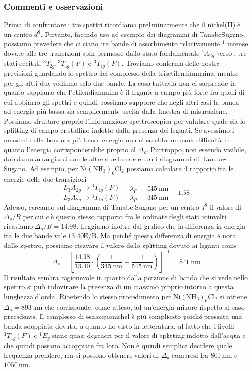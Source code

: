 \subsubsection{Commenti e osservazioni}
Prima di confrontare i tre spettri ricordiamo preliminarmente che il nichel(II) è un centro $d^8$. Pertanto, facendo uso ad esempio dei diagrammi di TanabeSugano, possiamo prevedere che ci siano tre bande di assorbimento relativamente $^1$ intense dovute alle tre transizioni spin-permesse dallo stato fondamentale ${ }^3 A_{2 g}$ verso i tre stati eccitati ${ }^3 T_{2 g},{ }^3 T_{1 g}(F)$ e ${ }^3 T_{1 g}(P)$. Troviamo conferma delle nostre previsioni guardando lo spettro del complesso della trisetilendiammina, mentre per gli altri due vediamo solo due bande. La cosa tuttavia non ci sorprende in quanto sappiamo che l'etilendiammina è il legante a campo più forte fra quelli di cui abbiamo gli spettri e quindi possiamo supporre che negli altri casi la banda ad energia più bassa sia semplicemente uscita dalla finestra di misurazione. Possiamo sfruttare proprio l'informazione spettroscopica per valutare quale sia lo splitting di campo cristallino indotto dalla presenza dei leganti. Se avessimo i massimi della banda a più bassa energia non ci sarebbe nessuna difficoltà in quanto l'energia corrisponderebbe proprio al $\Delta_o$. Purtroppo, non essendo visibile, dobbiamo arrangiarci con le altre due bande e con i diagrammi di Tanabe-Sugano. Ad esempio, per $\mathrm{Ni}\left(\mathrm{NH}_3\right)_6 \mathrm{Cl}_2$ possiamo calcolare il rapporto fra le energie delle due transizioni
$$
\frac{E_3 A_{2 g} \rightarrow{ }^3 T_{1 g}(P)}{E_3 A_{2 g} \rightarrow{ }^3 T_{1 g}(F)}=\frac{\lambda_F}{\lambda_P}=\frac{545 \mathrm{~nm}}{345 \mathrm{~nm}}=1.58
$$
Adesso, cercando sul diagramma di Tanabe-Sugano per un centro $d^8$ il valore di $\Delta_o / B$ per cui c'è questo stesso rapporto fra le ordinate degli stati coinvolti ricaviamo $\Delta_o / B=14.98$. Leggiamo inoltre dal grafico che la differenza in energia fra le due bande vale $13.40 \mathrm{E} / \mathrm{B}$. Ma poiché questa differenza di energia è nota dallo spettro, possiamo ricavare il valore dello splitting dovuto ai leganti come
$$
\Delta_o=\left[\frac{14.98}{13.40} \cdot\left(\frac{1}{345 \mathrm{~nm}}-\frac{1}{545 \mathrm{~nm}}\right)\right]^{-1}=841 \mathrm{~nm}
$$
Il risultato sembra ragionevole in quanto dalla porzione di banda che si vede nello spettro si può indovinare la presenza di un massimo proprio intorno a questa lunghezza d'onda. Ripetendo lo stesso procedimento per $\mathrm{Ni}\left(\mathrm{NH}_3\right)_6 \mathrm{Cl}_2$ si ottiene $\Delta_o=893 \mathrm{~nm}$ che corrisponde, come atteso, ad un'energia minore rispetto al caso precedente. Il complesso di esaacquonichel è più complicato poiché presenta una banda sdoppiata dovuta, a quanto ho visto in letteratura, al fatto che i livelli ${ }^3 T_{1 g}(F)$ e ${ }^1 E_g$ siano quasi degeneri per il valore di splitting indotto dall'acqua e che quindi possano accoppiare fra loro. Non è quindi semplice decidere quale frequenza prendere, ma si possono ottenere valori di $\Delta_o$ compresi fra $800 \mathrm{~nm}$ e $1050 \mathrm{~nm}$.



